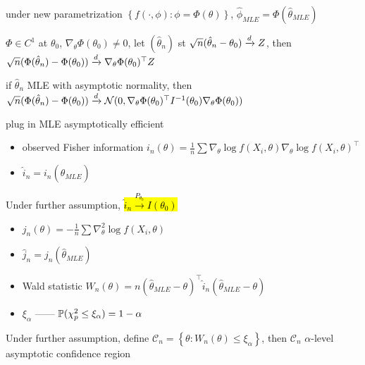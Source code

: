 \begin{fact}
    under new parametrization $\left\{ f(\cdot, \phi) : \phi = \Phi(\theta) \right\}$, $\hat \phi_{MLE} = \Phi (\hat \theta_{MLE})$
\end{fact}

\begin{thm}
    $\Phi \in C^1$ at $\theta_0$, $\nabla_\theta \Phi(\theta_0) \neq 0$, let $(\hat \theta_n)$ st $\sqrt{n}(\hat \theta_n - \theta_0) \xrightarrow{d} Z$, then\\
    $\sqrt{n} (\Phi(\hat \theta_n) - \Phi(\theta_0)) \xrightarrow{d} \nabla_\theta \Phi(\theta_0)^\top Z$
\end{thm}

\begin{fact}
    if $\hat \theta_n$ MLE with asymptotic normality, then $\sqrt{n}(\Phi(\hat \theta_n) - \Phi(\theta_0)) \xrightarrow{d} \mathcal{N}(0, \nabla_\theta \Phi(\theta_0)^\top I^{-1}(\theta_0) \nabla_\theta \Phi(\theta_0))$
\end{fact}

\begin{fact}
    plug in MLE asymptotically efficient
\end{fact}

\begin{itemize}
    \item observed Fisher information $i_n(\theta) = \frac{1}{n}\sum \nabla_\theta \log f(X_i, \theta) \nabla_\theta \log f(X_i, \theta)^\top$
    \item $\hat i_n = i_n(\hat \theta_{MLE})$
\end{itemize}

\begin{prop}
    Under further assumption, \hl{$\hat i_n \xrightarrow{P_{\theta_0}} I(\theta_0)$}
\end{prop}

\begin{itemize}
    \item $j_n(\theta) = -\frac{1}{n} \sum \nabla^2_\theta \log f(X_i, \theta)$
    \item $\hat j_n = j_n(\hat \theta_{MLE})$
    \item Wald statistic $W_n(\theta) = n(\hat \theta_{MLE} - \theta)^\top \hat i_n (\hat \theta_{MLE} - \theta)$
    \item $\xi_\alpha$ ------ $\mathbb{P}(\chi_p^2 \leq \xi_\alpha) = 1 - \alpha$
\end{itemize}

\begin{prop}
    Under further assumption, define $\mathcal{C}_n = \left\{ \theta : W_n(\theta) \leq \xi_\alpha \right\}$, then $\mathcal{C}_n$ $\alpha$-level asymptotic confidence region
\end{prop}

